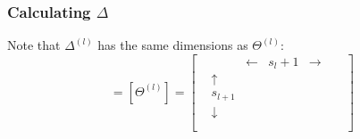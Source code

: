 \documentclass[12pt]{article}
\begin{document}
\subsubsection*{Calculating $\Delta$}
Note that $\Delta^{(l)}$ has the same dimensions as $\Theta^{(l)}$:
\begin{equation}
[\delta^{(l)}]=[\Theta^{(l)}]=\begin{bmatrix}
& & \leftarrow & s_{l}+1 & \rightarrow & &\\
& \uparrow & & & & & \\
& s_{l+1} & & & & & \\
& \downarrow & & & & & \\
& & & & & & \\
\end{bmatrix}
\end{equation}
\end{document}
